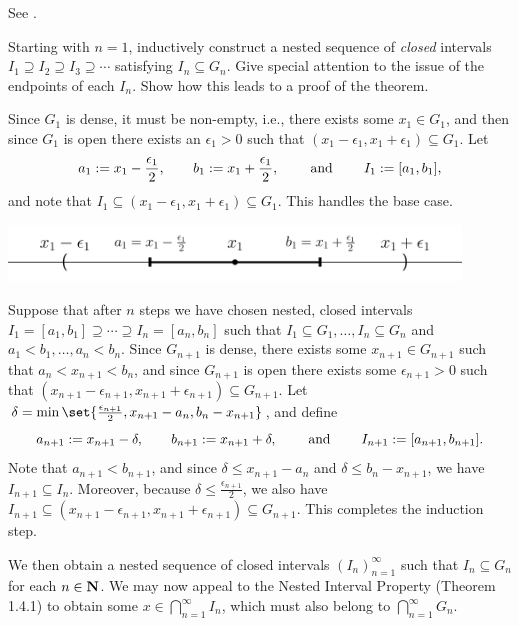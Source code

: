 \documentclass{lew98_solutions}
\begin{document}
\begin{solution}
    See .
\end{solution}

\begin{exercise}
\label{ex:3.5.4}
    Starting with \( n = 1 \), inductively construct a nested sequence of \textit{closed} intervals \( I_1 \supseteq I_2 \supseteq I_3 \supseteq \cdots \) satisfying \( I_n \subseteq G_n \). Give special attention to the issue of the endpoints of each \( I_n \). Show how this leads to a proof of the theorem.
\end{exercise}

\begin{solution}
    Since \( G_1 \) is dense, it must be non-empty, i.e., there exists some \( x_1 \in G_1 \), and then since \( G_1 \) is open there exists an \( \epsilon_1 > 0 \) such that \( (x_1 - \epsilon_1, x_1 + \epsilon_1) \subseteq G_1 \). Let
    \[
        a_1 := x_1 - \frac{\epsilon_1}{2}, \qquad b_1 := x_1 + \frac{\epsilon_1}{2}, \hspace{8mm} \text{and} \hspace{8mm} I_1 := [a_1, b_1],
    \]
    and note that \( I_1 \subseteq (x_1 - \epsilon_1, x_1 + \epsilon_1) \subseteq G_1 \). This handles the base case.
    
    \begin{center}
        \includegraphics[width=0.9\textwidth]{UA_Figures/UA_ex3_5_4_fig.pdf}
    \end{center}

    Suppose that after \( n \) steps we have chosen nested, closed intervals \( I_1 = [a_1, b_1] \supseteq \cdots \supseteq I_n = [a_n, b_n] \) such that \( I_1 \subseteq G_1, \ldots, I_n \subseteq G_n \) and \( a_1 < b_1, \ldots, a_n < b_n \). Since \( G_{n+1} \) is dense, there exists some \( x_{n+1} \in G_{n+1} \) such that \( a_n < x_{n+1} < b_n \), and since \( G_{n+1} \) is open there exists some \( \epsilon_{n+1} > 0 \) such that \( (x_{n+1} - \epsilon_{n+1}, x_{n+1} + \epsilon_{n+1}) \subseteq G_{n+1} \). Let \( \delta = \min \set{ \tfrac{\epsilon_{n+1}}{2}, x_{n+1} - a_n, b_n - x_{n+1} } \), and define
    \[
        a_{n+1} := x_{n+1} - \delta, \qquad b_{n+1} := x_{n+1} + \delta, \hspace{8mm} \text{and} \hspace{8mm} I_{n+1} := [a_{n+1}, b_{n+1}].
    \]
    Note that \( a_{n+1} < b_{n+1} \), and since \( \delta \leq x_{n+1} - a_n \) and \( \delta \leq b_n - x_{n+1} \), we have \( I_{n+1} \subseteq I_n \). Moreover, because \( \delta \leq \tfrac{\epsilon_{n+1}}{2} \), we also have \( I_{n+1} \subseteq (x_{n+1} - \epsilon_{n+1}, x_{n+1} + \epsilon_{n+1}) \subseteq G_{n+1} \). This completes the induction step.

    We then obtain a nested sequence of closed intervals \( (I_n)_{n=1}^{\infty} \) such that \( I_n \subseteq G_n \) for each \( n \in \mathbf{N} \). We may now appeal to the Nested Interval Property (Theorem 1.4.1) to obtain some \( x \in \bigcap_{n=1}^{\infty} I_n \), which must also belong to \( \bigcap_{n=1}^{\infty} G_n \).
\end{solution}
\end{document}
